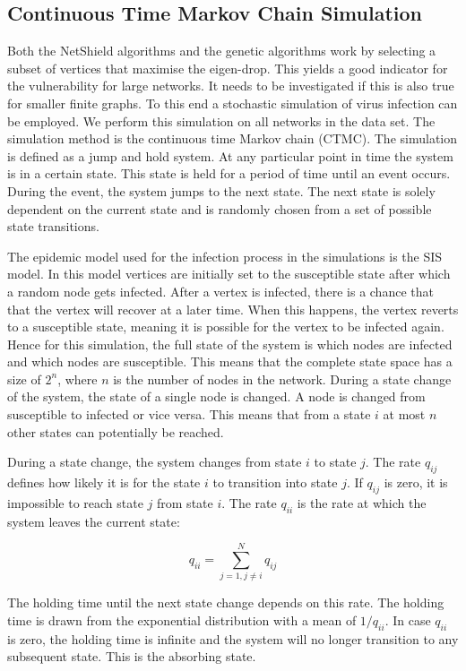\documentclass[11pt]{article}
\theoremstyle{definition}
\begin{document}
\subsection{Continuous Time Markov Chain Simulation}

Both the NetShield algorithms and the genetic algorithms work by selecting a subset of vertices that maximise the eigen-drop. This yields a good indicator for the vulnerability for large networks. It needs to be investigated if this is also true for smaller finite graphs. To this end a stochastic simulation of virus infection can be employed. We perform this simulation on all networks in the data set. The simulation method is the continuous time Markov chain (CTMC). The simulation is defined as a jump and hold system. At any particular point in time the system is in a certain state. This state is held for a period of time until an event occurs. During the event, the system jumps to the next state. The next state is solely dependent on the current state and is randomly chosen from a set of possible state transitions.

The epidemic model used for the infection process in the simulations is the SIS model. In this model vertices are initially set to the susceptible state after which a random node gets infected. After a vertex is infected, there is a chance that that the vertex will recover at a later time. When this happens, the vertex reverts to a susceptible state, meaning it is possible for the vertex to be infected again. Hence for this simulation, the full state of the system is which nodes are infected and which nodes are susceptible. This means that the complete state space has a size of $2^n$, where $n$ is the number of nodes in the network. During a state change of the system, the state of a single node is changed. A node is changed from susceptible to infected or vice versa. This means that from a state $i$ at most $n$ other states can potentially be reached.

During a state change, the system changes from state $i$ to state $j$. The rate $q_{ij}$ defines how likely it is for the state $i$ to transition into state $j$. If $q_{ij}$ is zero, it is impossible to reach state $j$ from state $i$. The rate $q_{ii}$ is the rate at which the system leaves the current state:

\begin{equation}
    q_{ii} = \sum_{j=1, j \neq i}^{N} q_{ij}
\end{equation}

The holding time until the next state change depends on this rate. The holding time is drawn from the exponential distribution with a mean of $1/q_{ii}$. In case $q_{ii}$ is zero, the holding time is infinite and the system will no longer transition to any subsequent state. This is the absorbing state.
\end{document}
